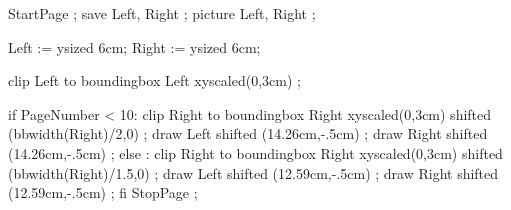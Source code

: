 

\setupcolors[textcolor={simpleslides:textcolor}]



\beginOLDTEX
{}

\endOLDTEX

\beginLUATEX
{}
\endLUATEX





\unexpanded{}

\unexpanded{}


StartPage ;
save Left, Right ;
picture Left, Right ;

Left  :=  ysized 6cm; 
Right :=  ysized 6cm; 

clip Left  to boundingbox Left  xyscaled(0,3cm) ;

if PageNumber < 10:
	clip Right to boundingbox Right xyscaled(0,3cm) shifted (bbwidth(Right)/2,0) ;
	draw Left  shifted (14.26cm,-.5cm) ;
	draw Right shifted (14.26cm,-.5cm) ;
else :
	clip Right to boundingbox Right xyscaled(0,3cm) shifted (bbwidth(Right)/1.5,0) ;
	draw Left  shifted (12.59cm,-.5cm) ; 
	draw Right shifted (12.59cm,-.5cm) ;
fi
StopPage ;
\stopuseMPgraphic

